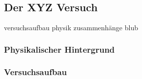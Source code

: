 \subsection{Der XYZ Versuch}
versuchsaufbau physik zusammenhänge blub

\subsubsection{Physikalischer Hintergrund}

\subsubsection{Versuchsaufbau}